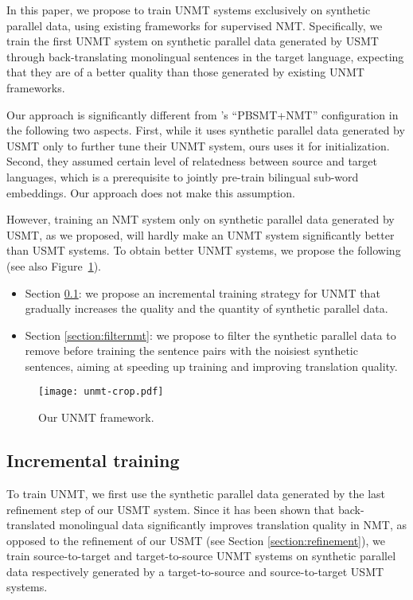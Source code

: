 \documentclass[11pt,a4paper]{article}
\newcommand{\Sec}[1]{{Section \ref{section:#1}}}
\begin{document}
In this paper, we propose to train UNMT systems exclusively on synthetic parallel data, using existing frameworks for supervised NMT.
Specifically, we train the first UNMT system on synthetic parallel data generated by USMT through back-translating monolingual sentences in the target language, expecting that they are of a better quality than those generated by existing UNMT frameworks.

Our approach is significantly different from \citet{DBLP:journals/corr/abs-1804-07755}'s ``PBSMT+NMT'' configuration in the following two aspects.
First, while it uses synthetic parallel data generated by USMT only to further tune their UNMT system, ours uses it for initialization.
Second, they assumed certain level of relatedness between source and target languages, which is a prerequisite to jointly pre-train bilingual sub-word embeddings. Our approach does not make this assumption.

However, training an NMT system only on synthetic parallel data generated by USMT, as we proposed, will hardly make an UNMT system significantly better than USMT systems. To obtain better UNMT systems, we propose the following (see also Figure~\ref{fig:unmt}).
\begin{itemize}\itemsep=0mm
\item Section \ref{section:incr}: we propose an incremental training strategy for UNMT that gradually increases the quality and the quantity of synthetic parallel data.
\item Section \ref{section:filternmt}: we propose to filter the synthetic parallel data to remove before training the sentence pairs with the noisiest synthetic sentences, aiming at speeding up training and improving translation quality.
\end{itemize}

\begin{figure}[t]
    \centering
            \texttt{[image: unmt-crop.pdf]}
    \caption{\label{fig:unmt} Our UNMT framework.}
\end{figure}


\subsection{Incremental training}
\label{section:incr}

To train UNMT, we first use the synthetic parallel data generated by the last refinement step of our USMT system. Since it has been shown that back-translated monolingual data significantly improves translation quality in NMT, as opposed to the refinement of our USMT (see \Sec{refinement}), we train source-to-target and target-to-source UNMT systems on synthetic parallel data respectively generated by a target-to-source and source-to-target USMT systems.
\end{document}
